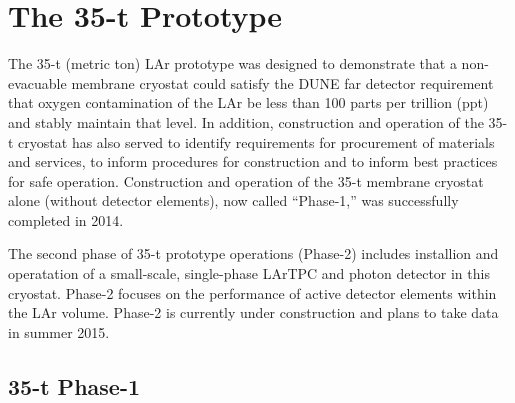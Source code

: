 \section{The 35-t Prototype}
\label{sec:proto-35t}

The 35-t (metric ton) LAr prototype was designed to demonstrate that a
non-evacuable membrane cryostat could satisfy the DUNE far detector
requirement that oxygen contamination of the LAr be less than 100
parts per trillion (ppt) and stably maintain that level.  In addition,
construction and operation of the 35-t cryostat has also served to
identify requirements for procurement of materials and services, to
inform procedures for construction and to inform best practices for
safe operation.  Construction and operation of the 35-t membrane
cryostat alone (without detector elements), now called ``Phase-1,''
was successfully completed in 2014.

The second phase of 35-t prototype operations (Phase-2) includes
installion and operatation of a small-scale, single-phase LArTPC and
photon detector in this cryostat.  Phase-2 focuses on the performance
of active detector elements within the LAr volume.  Phase-2 is
currently under construction and plans to take data in summer 2015.

\subsection{35-t Phase-1}

